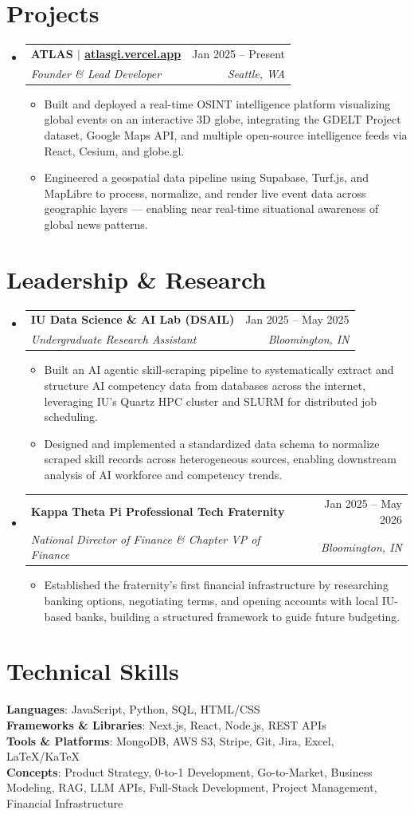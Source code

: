 \documentclass[letterpaper,11pt]{article}
\makeatletter
\newcommand{\resumeItem}[1]{\item\small{#1 \vspace{-2pt}}}
\newcommand{\resumeSubheading}[4]{\vspace{-2pt}\item\begin{tabular*}{0.97\textwidth}[t]{l@{\extracolsep{\fill}}r}\textbf{#1} & #2 \\\textit{\small#3} & \textit{\small #4} \\\end{tabular*}\vspace{-7pt}}
\newcommand{\resumeSubHeadingListStart}{\begin{itemize}[leftmargin=0.15in, label={}]}
\newcommand{\resumeSubHeadingListEnd}{\end{itemize}}
\newcommand{\resumeItemListStart}{\begin{itemize}}
\newcommand{\resumeItemListEnd}{\end{itemize}\vspace{-5pt}}
\makeatother
\begin{document}
\section{Projects}
  \resumeSubHeadingListStart
    \resumeSubheading
      {ATLAS $|$ \href{https://atlasgi.vercel.app}{atlasgi.vercel.app}}{Jan 2025 -- Present}
      {Founder \& Lead Developer}{Seattle, WA}
      \resumeItemListStart
        \resumeItem{Built and deployed a real-time OSINT intelligence platform visualizing global events on an interactive 3D globe, integrating the GDELT Project dataset, Google Maps API, and multiple open-source intelligence feeds via React, Cesium, and globe.gl.}
        \resumeItem{Engineered a geospatial data pipeline using Supabase, Turf.js, and MapLibre to process, normalize, and render live event data across geographic layers — enabling near real-time situational awareness of global news patterns.}
      \resumeItemListEnd
  \resumeSubHeadingListEnd

\section{Leadership \& Research}
  \resumeSubHeadingListStart
    \resumeSubheading
      {IU Data Science \& AI Lab (DSAIL)}{Jan 2025 -- May 2025}
      {Undergraduate Research Assistant}{Bloomington, IN}
      \resumeItemListStart
        \resumeItem{Built an AI agentic skill-scraping pipeline to systematically extract and structure AI competency data from databases across the internet, leveraging IU's Quartz HPC cluster and SLURM for distributed job scheduling.}
        \resumeItem{Designed and implemented a standardized data schema to normalize scraped skill records across heterogeneous sources, enabling downstream analysis of AI workforce and competency trends.}
      \resumeItemListEnd
    \resumeSubheading
      {Kappa Theta Pi Professional Tech Fraternity}{Jan 2025 -- May 2026}
      {National Director of Finance \& Chapter VP of Finance}{Bloomington, IN}
      \resumeItemListStart
        \resumeItem{Established the fraternity's first financial infrastructure by researching banking options, negotiating terms, and opening accounts with local IU-based banks, building a structured framework to guide future budgeting.}
      \resumeItemListEnd
  \resumeSubHeadingListEnd

\section{Technical Skills}
 \begin{itemize}[leftmargin=0.15in, label={}]
    \small{\item{
     \textbf{Languages}{: JavaScript, Python, SQL, HTML/CSS} \\
     \textbf{Frameworks \& Libraries}{: Next.js, React, Node.js, REST APIs} \\
     \textbf{Tools \& Platforms}{: MongoDB, AWS S3, Stripe, Git, Jira, Excel, LaTeX/KaTeX} \\
     \textbf{Concepts}{: Product Strategy, 0-to-1 Development, Go-to-Market, Business Modeling, RAG, LLM APIs, Full-Stack Development, Project Management, Financial Infrastructure}
    }}
 \end{itemize}
\end{document}
